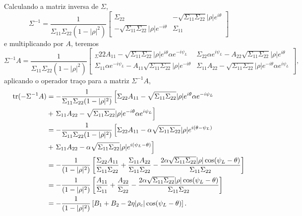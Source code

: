 Calculando a matriz inversa de $\Sigma$,
\begin{equation}\label{ap:mat_sig_inv}
	\Sigma^{-1}=\frac{1}{\Sigma_{11}\Sigma_{22}(1-|\rho|^2)}\left[
\begin{array}{ll}
	\Sigma_{22}              & -\sqrt{\Sigma_{11}\Sigma_{22}}|\rho|e^{i\theta} \\
 -\sqrt{\Sigma_{11}\Sigma_{22}}|\rho|e^{-i\theta} & \Sigma_{11}\\
\end{array}\right]
\end{equation}
e multiplicando por $A$, teremos
\begin{equation*}
	\Sigma^{-1}A=\frac{1}{\Sigma_{11}\Sigma_{22}(1-|\rho|^2)}\left[
\begin{array}{ll}
	_\Sigma{22}A_{11}-\sqrt{\Sigma_{11}\Sigma_{22}}|\rho|e^{i\theta}\alpha e^{-i\psi_L} & \Sigma_{22} \alpha e^{i\psi_L}-A_{22}\sqrt{\Sigma_{11}\Sigma_{22}}|\rho|e^{i\theta} \\
	\Sigma_{11}\alpha e^{-i\psi_L}-A_{11}\sqrt{\Sigma_{11}\Sigma_{22}}|\rho|e^{-i\theta} & \Sigma_{11}A_{22}-\sqrt{\Sigma_{11}\Sigma_{22}}|\rho|e^{-i\theta}\alpha e^{i\psi_L} \\
\end{array}\right],
\end{equation*}
aplicando o operador traço para a matriz $\Sigma^{-1}A$,
\begin{equation*}
\begin{split}
	\operatorname{tr}(-\Sigma^{-1}A)&=-\frac{1}{\Sigma_{11}\Sigma_{22}(1-|\rho|^2)}\left[
	\Sigma_{22}A_{11}-\sqrt{\Sigma_{11}\Sigma_{22}}|\rho|e^{i\theta}\alpha e^{-i\psi_L}\right. \\
	                &+\left. \Sigma_{11}A_{22}-\sqrt{\Sigma_{11}\Sigma_{22}}|\rho|e^{-i\theta}\alpha e^{i\psi_L} \right]\\
	                     &=-\frac{1}{\Sigma_{11}\Sigma_{22}(1-|\rho|^2)}\left[
		\Sigma_{22}A_{11}-\alpha \sqrt{\Sigma_{11}\Sigma_{22}}|\rho|e^{i(\theta-\psi_L)}\right.\\
		            &+\left. \Sigma_{11}A_{22}-\alpha \sqrt{\Sigma_{11}\Sigma_{22}}|\rho|e^{i(\psi_L-\theta)}\right]\\
		       	    &=-\frac{1}{(1-|\rho|^2)}\left[\frac{\Sigma_{22}A_{11}}{\Sigma_{11}\Sigma_{22}}+\frac{\Sigma_{11}A_{22}}{\Sigma_{11}\Sigma_{22}}-\frac{2\alpha \sqrt{\Sigma_{11}\Sigma_{22}}|\rho| \cos(\psi_L-\theta)}{\Sigma_{11}\Sigma_{22}}\right]\\
		       	    &=-\frac{1}{(1-|\rho|^2)}\left[
	\frac{A_{11}}{\Sigma_{11}}+\frac{A_{22}}{\Sigma_{22}}-\frac{2\alpha \sqrt{\Sigma_{11}\Sigma_{22}}|\rho|\cos(\psi_L-\theta)}{\Sigma_{11}\Sigma_{22}}\right]\\
	&=-\frac{1}{(1-|\rho|^2)}\left[B_1+B_2-2\eta |\rho_c |\cos(\psi_L-\theta)\right].
	\end{split}
\end{equation*}

